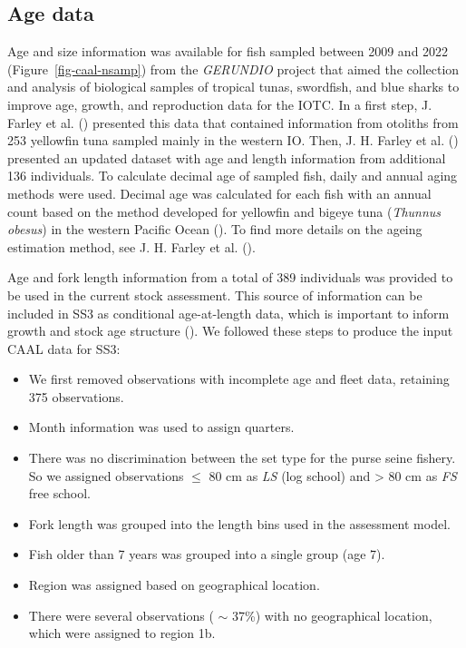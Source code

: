 \documentclass[
]{scrartcl}
\providecommand{\tightlist}{%
  \setlength{\itemsep}{0pt}\setlength{\parskip}{0pt}}\usepackage{longtable,booktabs,array}
\begin{document}
\subsection{Age data}\label{age-data}

Age and size information was available for fish sampled between 2009 and
2022 (Figure~\ref{fig-caal-nsamp}) from the \emph{GERUNDIO} project that
aimed the collection and analysis of biological samples of tropical
tunas, swordfish, and blue sharks to improve age, growth, and
reproduction data for the IOTC. In a first step, J. Farley et al.
() presented this data
that contained information from otoliths from 253 yellowfin tuna sampled
mainly in the western IO. Then, J. H. Farley et al.
() presented an
updated dataset with age and length information from additional 136
individuals. To calculate decimal age of sampled fish, daily and annual
aging methods were used. Decimal age was calculated for each fish with
an annual count based on the method developed for yellowfin and bigeye
tuna (\emph{Thunnus obesus}) in the western Pacific Ocean
(). To
find more details on the ageing estimation method, see J. H. Farley et
al. ().

Age and fork length information from a total of 389 individuals was
provided to be used in the current stock assessment. This source of
information can be included in SS3 as conditional age-at-length data,
which is important to inform growth and stock age structure
(). We followed
these steps to produce the input CAAL data for SS3:

\begin{itemize}
\tightlist
\item
  We first removed observations with incomplete age and fleet data,
  retaining 375 observations.
\item
  Month information was used to assign quarters.
\item
  There was no discrimination between the set type for the purse seine
  fishery. So we assigned observations \(\leq\) 80 cm as \emph{LS} (log
  school) and \textgreater{} 80 cm as \emph{FS} free school.
\item
  Fork length was grouped into the length bins used in the assessment
  model.
\item
  Fish older than 7 years was grouped into a single group (age 7).
\item
  Region was assigned based on geographical location.
\item
  There were several observations ( \(\sim\) 37\%) with no geographical
  location, which were assigned to region 1b.
\end{itemize}
\end{document}
